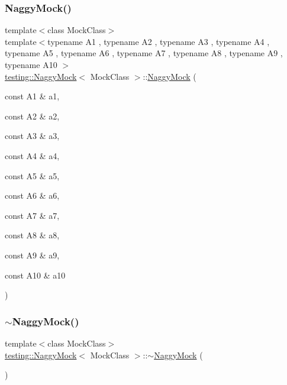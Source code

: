 \subsubsection{\texorpdfstring{NaggyMock()}{NaggyMock()}\hspace{0.1cm}{\footnotesize\ttfamily [17/17]}}
{\footnotesize\ttfamily template$<$class Mock\+Class$>$ \\
template$<$typename A1 , typename A2 , typename A3 , typename A4 , typename A5 , typename A6 , typename A7 , typename A8 , typename A9 , typename A10 $>$ \\
\mbox{\hyperlink{classtesting_1_1_naggy_mock}{testing\+::\+Naggy\+Mock}}$<$ Mock\+Class $>$\+::\mbox{\hyperlink{classtesting_1_1_naggy_mock}{Naggy\+Mock}} (\begin{DoxyParamCaption}\item[{const A1 \&}]{a1,  }\item[{const A2 \&}]{a2,  }\item[{const A3 \&}]{a3,  }\item[{const A4 \&}]{a4,  }\item[{const A5 \&}]{a5,  }\item[{const A6 \&}]{a6,  }\item[{const A7 \&}]{a7,  }\item[{const A8 \&}]{a8,  }\item[{const A9 \&}]{a9,  }\item[{const A10 \&}]{a10 }\end{DoxyParamCaption})\hspace{0.3cm}{\ttfamily [inline]}}

\mbox{\label{classtesting_1_1_naggy_mock_a9d00e4811942489b4c3cdd8e8c658518}} 
\subsubsection{\texorpdfstring{$\sim$NaggyMock()}{~NaggyMock()}\hspace{0.1cm}{\footnotesize\ttfamily [3/3]}}
{\footnotesize\ttfamily template$<$class Mock\+Class$>$ \\
\mbox{\hyperlink{classtesting_1_1_naggy_mock}{testing\+::\+Naggy\+Mock}}$<$ Mock\+Class $>$\+::$\sim$\mbox{\hyperlink{classtesting_1_1_naggy_mock}{Naggy\+Mock}} (\begin{DoxyParamCaption}{ }\end{DoxyParamCaption})\hspace{0.3cm}{\ttfamily [inline]}}



